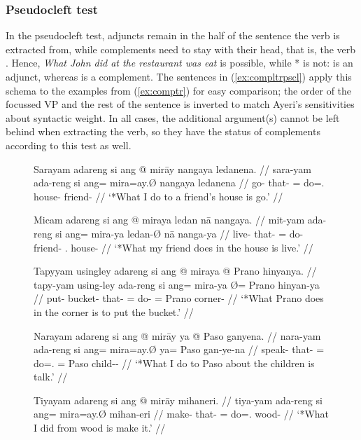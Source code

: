 \subsubsection{Pseudocleft test}

In the pseudocleft test, adjuncts remain in the half of the sentence the verb
is extracted from, while complements need to stay with their head, that is, the
verb \parencite[compare][407--408]{needhamtoivonen2011}. Hence, \emph{What John
did at the restaurant was eat} is possible, while * is not:  is an adjunct, whereas  is a complement. The sentences in (\ref{ex:compltrpscl}) apply this
schema to the examples from (\ref{ex:comptr}) for easy comparison; the order of
the focussed VP and the rest of the sentence is inverted to match Ayeri's
sensitivities about syntactic weight. In all cases, the additional argument(s)
cannot be left behind when extracting the verb, so they have the status of
complements according to this test as well.

\begin{figure}
\pex\label{ex:compltrpscl}
\a\label{ex:compltrpscl_1}%
\ljudge*\begingl
	\gla Sarayam adareng si ang @ mirāy nangaya ledanena. //
	\glb sara-yam ada-reng si ang= mira=ay.Ø nangaya ledanena //
	\glc go-\Ptcp{} that-\AargI{} \Rel{} \AgtT{}= do=\Fsg{}.\Top{} house-\Loc{}
		friend-\Gen{} //
	\glft `*What I do to a friend's house is go.' //
\endgl

\a\label{ex:compltrpscl_2}%
\ljudge*\begingl
	\gla Micam adareng si ang @ miraya ledan nā nangaya. //
	\glb mit-yam ada-reng si ang= mira-ya ledan-Ø nā nanga-ya //
	\glc live-\Ptcp{} that-\AargI{} \Rel{} \AgtT{}= do-\TsgM{} friend-\Top{}
		\Fsg{}.\Gen{} house-\Loc{} //
	\glft `*What my friend does in the house is live.' //
\endgl

\a\label{ex:compltrpscl_3}%
\ljudge*\begingl
	\gla Tapyyam usingley adareng si ang @ miraya {} @ Prano hinyanya. //
	\glb tapy-yam using-ley ada-reng si ang= mira-ya Ø= Prano hinyan-ya //
	\glc put-\Ptcp{} bucket-\PargI{} that-\AargI{} \Rel{} \AgtT{}= do-\TsgM{}
		\Top {}= Prano corner-\Loc{} //
	\glft `*What Prano does in the corner is to put the bucket.' //
\endgl

\a\label{ex:compltrpscl_4}%
\ljudge*\begingl
	\gla Narayam adareng si ang @ mirāy ya @ Paso ganyena. //
	\glb nara-yam ada-reng si ang= mira=ay.Ø ya= Paso gan-ye-na //
	\glc speak-\Ptcp{} that-\AargI{} \Rel{} \AgtT{}= do=\Fsg{}.\Top{} \Loc{}=
		Paso child-\Pl{}-\Gen{} //
	\glft `*What I do to Paso about the children is talk.' //
\endgl

\a\label{ex:compltrpscl_5}%
\ljudge*\begingl
	\gla Tiyayam adareng si ang @ mirāy mihaneri. //
	\glb tiya-yam ada-reng si ang= mira=ay.Ø mihan-eri //
	\glc make-\Ptcp{} that-\AargI{} \Rel{} \AgtT{}= do=\Fsg{}.\Top{}
		wood-\Ins{} //
	\glft `*What I did from wood is make it.' //
\endgl

\xe
\end{figure}

